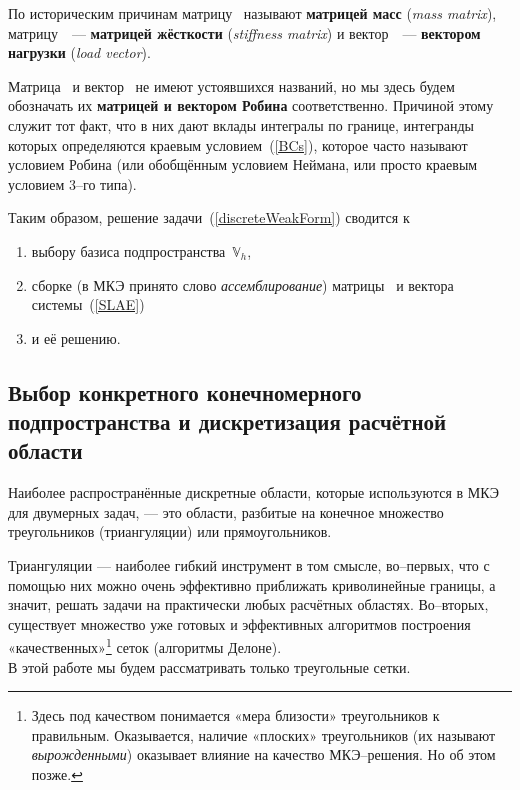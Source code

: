 По историческим причинам матрицу~ называют \textbf{матрицей масс} (\textit{mass matrix}), матрицу~~--- \textbf{матрицей жёсткости} (\textit{stiffness matrix}) и вектор~~--- \textbf{вектором нагрузки} (\textit{load vector}).

Матрица~ и вектор~ не имеют устоявшихся названий, но мы здесь будем обозначать их \textbf{матрицей и вектором Робина} соответственно. Причиной этому служит тот факт, что в них дают вклады интегралы по границе, интегранды которых определяются краевым условием~(\ref{BCs}), которое часто называют условием Робина (или обобщённым условием Неймана, или просто краевым условием 3--го типа).

Таким образом, решение задачи~(\ref{discreteWeakForm}) сводится к
\begin{enumerate}
	\item выбору базиса подпространства~$\mathbb{V}_h$, 
	\item сборке (в МКЭ принято слово \textit{ассемблирование}) матрицы~ и вектора~ системы~(\ref{SLAE})
	\item и её решению. 
\end{enumerate}

\subsection{Выбор конкретного конечномерного подпространства и дискретизация расчётной области}
\label{workOnDiscreteMesh}

Наиболее распространённые дискретные области, которые используются в МКЭ для двумерных задач, --- это области, разбитые на конечное множество треугольников (триангуляции) или прямоугольников.

Триангуляции --- наиболее гибкий инструмент в том смысле, во--первых, что с помощью них можно очень эффективно приближать криволинейные границы, а значит, решать задачи на практически любых расчётных областях. Во--вторых, существует множество уже готовых и эффективных алгоритмов построения «качественных»\footnote{
	Здесь под качеством понимается «мера близости» треугольников к правильным. Оказывается, наличие «плоских» треугольников (их называют \textit{вырожденными}) оказывает влияние на качество МКЭ--решения. Но об этом позже. 
} сеток (алгоритмы Делоне). \\
В этой работе мы будем рассматривать только треугольные сетки.

